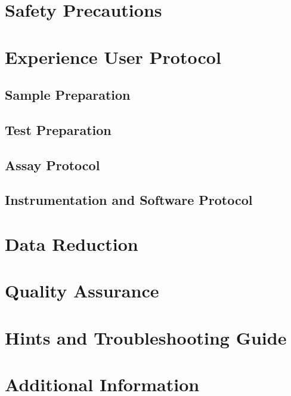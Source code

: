 \section{Safety Precautions}

\section{Experience User Protocol}
\subsection{Sample Preparation}
\subsection{Test Preparation}
\subsection{Assay Protocol}
\subsection{Instrumentation and Software Protocol}

\section{Data Reduction}

\section{Quality Assurance}

\section{Hints and Troubleshooting Guide}

\section{Additional Information}
